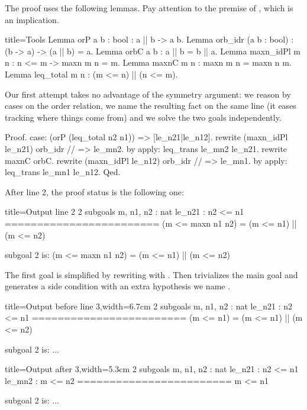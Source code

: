 The proof uses the following lemmas.  Pay attention to the premise of
, which is an implication.

\begin{coq}{}{title=Tools}
Lemma orP {a b : bool} : a || b -> a \/ b.
Lemma orb_idr (a b : bool) : (b -> a) -> (a || b) = a.
Lemma orbC a b : a || b = b || a.
Lemma maxn_idPl {m n} : n <= m -> maxn m n = m.
Lemma maxnC m n : maxn m n = maxn n m.
Lemma leq_total m n : (m <= n) || (n <= m).
\end{coq}

Our first attempt takes no advantage of the symmetry argument:
we reason by cases on the order relation,
we name the resulting fact on the same line
(it eases tracking where things come from) and we solve the two
goals independently.

\begin{coq}{}{}
Proof.
case: (orP (leq_total n2 n1)) => [le_n21|le_n12].
  rewrite (maxn_idPl le_n21) orb_idr // => le_mn2.
  by apply: leq_trans le_mn2 le_n21.
rewrite maxnC orbC.
rewrite (maxn_idPl le_n12) orb_idr // => le_mn1.
by apply: leq_trans le_mn1 le_n12.
Qed.
\end{coq}

After line 2, the proof status is the following one:

\begin{coqout}{}{title=Output line 2}
2 subgoals
m, n1, n2 : nat
le_n21 : n2 <= n1
========================
(m <= maxn n1 n2) = (m <= n1) || (m <= n2)

subgoal 2 is:
(m <= maxn n1 n2) = (m <= n1) || (m <= n2)
\end{coqout}

The first goal is simplified by
rewriting with . %
Then  trivializes the main goal and generates a side condition with
an extra hypothesis we name .

\begin{coqout}{}{title=Output before line 3,width=6.7cm}
2 subgoals
m, n1, n2 : nat
le_n21 : n2 <= n1
========================
(m <= n1) = (m <= n1) || (m <= n2)

subgoal 2 is: ...
\end{coqout}
\begin{coqout}{}{title=Output after 3,width=5.3cm}
2 subgoals
m, n1, n2 : nat
le_n21 : n2 <= n1
le_mn2 : m <= n2
========================
m <= n1

subgoal 2 is: ...
\end{coqout}

